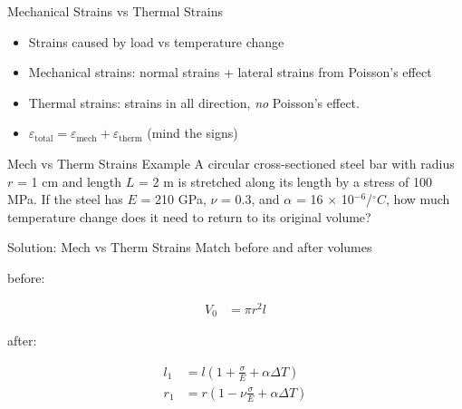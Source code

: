 \documentclass[10pt, svgnames]{beamer}
\begin{document}
\begin{frame}[label={sec:orgdc8cf96}]{Mechanical Strains vs Thermal Strains}
\begin{itemize}
\item Strains caused by load vs temperature change

\item Mechanical strains: normal strains + lateral strains from Poisson's
effect

\item Thermal strains: strains in all direction, \emph{no} Poisson's effect.

\item \(\varepsilon_{\text{total}} = \varepsilon_{\text{mech}} + \varepsilon_{\text{therm}}\)
(mind the signs)
\end{itemize}
\end{frame}

\begin{frame}[label={sec:orgdebb87e}]{Mech vs Therm Strains Example}
A circular cross-sectioned steel bar with
radius \(r\) = 1 cm and length \(L\) = 2 m is stretched along its length
by a stress of 100 MPa. If the steel has \(E\) = 210 GPa, \(\nu\) = 0.3,
and \(\alpha\) = 16 \(\times\) 10\(^{-6}\)/\(^{\circ}C\), how much
temperature change does it need to return to its original volume?
\end{frame}

\begin{frame}[label={sec:orgc7958b7}]{Solution: Mech vs Therm Strains}
Match before and after volumes

before:

\begin{align*}
    V_{0} &= \pi r^{2} l
\end{align*}

after:

\begin{align*}
    l_{1} &= l \left( 1 + \frac{\sigma}{E} + \alpha \Delta T \right) \\
    r_{1} &= r \left( 1 - \nu \frac{\sigma}{E} + \alpha \Delta T \right) \\
\end{align*}
\end{frame}
\end{document}
